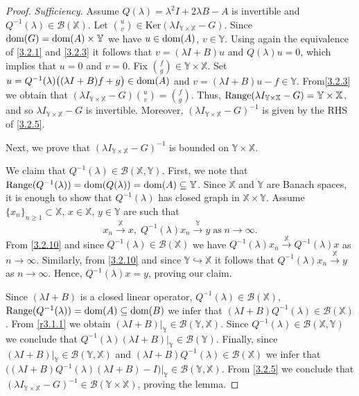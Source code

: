 \documentclass[11pt]{amsart}
\numberwithin{equation}{section}
\newcommand{\Ker}{{\mathrm{Ker}}}
\newcommand{\Range}{{\rm Range }}
\theoremstyle{remark}
\theoremstyle{definition}
\newcommand\bX{{\mathbb X}}
\newcommand\bY{{\mathbb Y}}
\newcommand{\dom}{\text{\rm{dom}}}
\begin{document}
\begin{proof}
	\noindent\textit{Sufficiency.} Assume $Q(\lambda) = \lambda^2 I + 2\lambda B - A$ is invertible and $Q^{-1}(\lambda) \in \mathcal{B}(\bX)$. Let $\binom{u}{v} \in \Ker(\lambda I_{\bY\times\bX} - G)$. Since $\dom(G)=\dom(A)\times\bY$ we have $u \in \dom(A)$, $v \in \bY$.
	Using again the equivalence of \eqref{3.2.1} and \eqref{3.2.3} it follows that
	$v = (\lambda I+B)u$ and  $Q(\lambda)u = 0 $, which implies that $u = 0$ and  $v = 0$. Fix $\binom{f}{g} \in\bY\times\bX$. Set $u = Q^{-1}(\lambda)\big((\lambda I+B)f + g\big)\in \dom(A)$ and
	$v = (\lambda I+B)u - f \in\bY$.  From\eqref{3.2.3} we obtain that
	$(\lambda I_{\bY\times\bX} - G)\binom{u}{v} = \binom{f}{g}$.
	Thus, $\Range(\lambda I_{\bY\times\bX} - G) = \bY \times \bX$, and so $\lambda I_{\bY\times \bX} - G$
	is invertible. Moreover, $(\lambda I_{\bY\times\bX} - G)^{-1}$ is given by the RHS of \eqref{3.2.5}.
	
	Next, we prove that $(\lambda I_{\bY\times\bX} - G)^{-1}$ is bounded on $\bY\times\bX$.
	
	We claim that  $Q^{-1}(\lambda) \in \mathcal{B}(\bX, \bY)$. First, we note that $\Range(Q^{-1}(\lambda)) = \dom(Q(\lambda)) = \dom(A) \subseteq \bY$.
	Since $\bX$ and $\bY$ are Banach spaces, it is enough to show that $Q^{-1}(\lambda)$ has closed graph
	in $\bX \times \bY$. Assume $\{x_n\}_{n \geq 1} \subset \bX$, $x \in\bX$, $y \in \bY$ are such that
	\begin{equation}\label{3.2.10}
		x_n \xrightarrow{\bX} x, \; Q^{-1}(\lambda)x_n \xrightarrow{\bY} y\;\mbox{as}\; n\to\infty.
	\end{equation}
	From \eqref{3.2.10} and since $Q^{-1}(\lambda) \in \mathcal{B}(\bX)$ we have $ Q^{-1}(\lambda)x_n \xrightarrow{\bX} Q^{-1}(\lambda)x$ as $n\to\infty$. Similarly, from \eqref{3.2.10} and since
	$\bY \hookrightarrow\bX$ it follows that $ Q^{-1}(\lambda)x_n \xrightarrow{\bX} y$ as $n\to\infty$. Hence, 
	$Q^{-1}(\lambda)x = y$, proving our claim. 
	
	Since $(\lambda I+B)$ is a closed linear operator, $Q^{-1}(\lambda) \in \mathcal{B}(\bX)$, $\Range(Q^{-1}(\lambda)) = \dom(A) \subseteq \dom(B)$ we infer that $(\lambda I+B)Q^{-1}(\lambda) \in \mathcal{B}(\bX)$. From \eqref{r3.1.1} we obtain $(\lambda I+B)|_\bY \in \mathcal{B}(\bY,\bX)$. Since $Q^{-1}(\lambda) \in \mathcal{B}(\bX, \bY)$ we conclude that $Q^{-1}(\lambda)(\lambda I+B)|_\bY \in \mathcal{B}(\bY)$. Finally, 
	since $(\lambda I+B)|_\bY \in \mathcal{B}(\bY,\bX)$ and $(\lambda I+B)Q^{-1}(\lambda) \in \mathcal{B}(\bX)$ we infer that $\bigl((\lambda I+B)Q^{-1}(\lambda)(\lambda I+B) - I\bigr)|_\bY\in \mathcal{B}(\bY,\bX)$. From \eqref{3.2.5} we conclude that 
	$(\lambda I_{\bY\times\bX} - G)^{-1}\in\mathcal{B}(\bY\times\bX)$, proving the lemma.
\end{proof}
\end{document}
